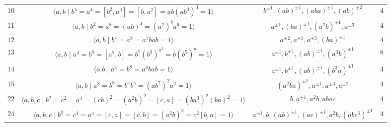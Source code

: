 \documentclass{amsart}
\begin{document}
{\begin{table}
\begin{tabular}{|c|c|c|c|}
			$10$&$\langle a,b\mid b^4=a^4=[b^{2},a^{3}]=[b,a^2]=ab(ab^3)^3=1\rangle$& $b^{\pm 1}, (ab)^{\pm 1}, (aba)^{\pm 1}, (ab)^{\pm 2}$&$4$\\
			$11$&$\langle a,b\mid b^2=a^8= (ab)^4=(a^2)^ba^6=1\rangle$ &   $a^{\pm 1}, (ba)^{\pm 1}, (a^2b)^{\pm 1}, a^{\pm 3} $ & $4$\\
			$12$&$\langle a,b\mid b^4=a^8=a^{7}bab=1\rangle$& $ a^{\pm 2}, a^{\pm 1}, a^{\pm 3}, (ba)^{\pm 1}$&$4$\\
			$13$&$\langle a,b\mid a^4=b^8=[a^{2},b]=b^{7}(b^3)^{a^{3}}= b(b^{5})^a=1\rangle$& $ a^{\pm 1}, b^{\pm 1}, (ab)^{\pm 1}, (a^3b)^{\pm 1}$&$8$\\
			$14$&$\langle a.b\mid  a^4=b^8= a^{3}bab=1 \rangle$& $ a^{\pm 1}, b^{\pm 1}, (ab)^{\pm 1}, (b^3a)^{\pm 1}$&$4$\\
			$15$&$\langle a,b\mid a^8=b^8=b^ab^5=(ab^{7})^2a^2=1\rangle$& $ (a^2ba)^{\pm 1},  a^{\pm 1}, a^{\pm 3}, a^{\pm 2}$&$4$\\
			$22$&$\langle a,b,c\mid  b^2=c^2=a^4=(cb)^2=(a^{2}b)^2=[c,a]=(ba^{3})^2(ba)^2=1\rangle$& $ b, a^{\pm 1}, a^2b, abac$&$4$\\		
			$24$&$\langle a,b,c\mid b^2=c^4=a^4=[c,a]=[c,b]=(a^{2}b)^2=c^2[b,a]=1\rangle$& $a^{\pm 1},b,(ab)^{\pm 1},(ac)^{\pm 1},a^2b,(abc^3)^{\pm 1}$&$4$\\					

\end{tabular}
\end{table}}
\end{document}
